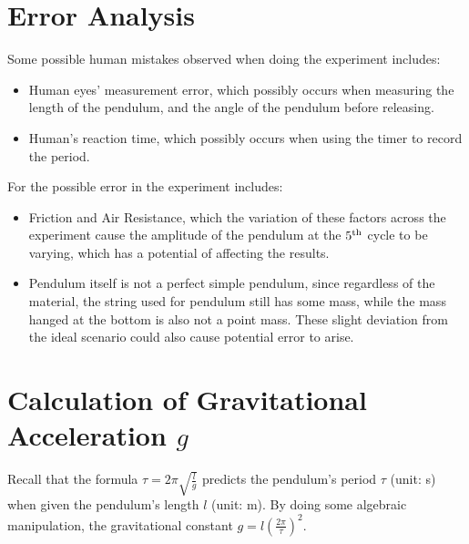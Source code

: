 \documentclass{article}
\begin{document}
\section{Error Analysis}
Some possible human mistakes observed when doing the experiment includes:
\begin{itemize}
    \item Human eyes' measurement error, which possibly occurs when measuring the length of the pendulum, and the angle of the pendulum before releasing.
    \item Human's reaction time, which possibly occurs when using the timer to record the period.
\end{itemize}
For the possible error in the experiment includes:
\begin{itemize}
    \item Friction and Air Resistance, which the variation of these factors across the experiment cause the amplitude of the pendulum at the $5^\textmd{th}$ cycle to be varying, which has a potential of affecting the results.
    \item Pendulum itself is not a perfect simple pendulum, since regardless of the material, the string used for pendulum still has some mass, while the mass hanged at the bottom is also not a point mass. These slight deviation from the ideal scenario could also cause potential error to arise.
\end{itemize}

\hfil

\section{Calculation of Gravitational Acceleration $g$}
Recall that the formula $\tau = 2\pi\sqrt{\frac{l}{g}}$ predicts the pendulum's period $\tau$ (unit: s) when given the pendulum's length $l$ (unit: m). By doing some algebraic manipulation, the gravitational constant $g = l\left(\frac{2\pi}{\tau}\right)^2$.
\end{document}
